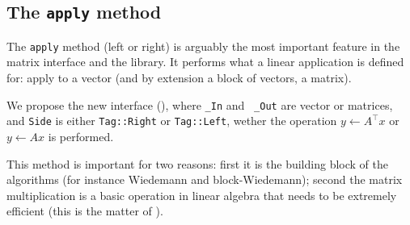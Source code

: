 \subsection{The \texttt{apply} method}\label{ssec:apply}
%
%
\par
%
The \texttt{apply} method (left or right) is arguably the most important
feature in the matrix interface and the \linbox library. It performs what a
linear application is defined for: apply to a vector (and by extension  a block
of vectors, \ie a matrix).
%
\par
%
We propose the new interface (), where {\tt \_In} and {\tt
\_Out} are vector or matrices, and {\tt Side} is either {\tt Tag::Right} or
{\tt Tag::Left}, wether the operation $y \gets A^{\top} x$ or  $y \gets A x$ is
performed.
%

%
This method is important for two reasons: first it is the building block of the
\applin algorithms (for instance Wiedemann and block-Wiedemann); second the
matrix multiplication is a basic operation in linear algebra that needs to be
extremely efficient (this is the matter of ).
%
%
%
